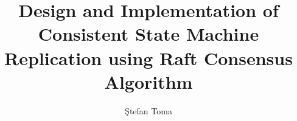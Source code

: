 \documentclass[12pt]{report}
\begin{document}
\title{Design and Implementation of Consistent State Machine Replication using Raft Consensus Algorithm}                     
\author{Ştefan Toma}                                            
                
\maketitle


\clearpage


\tableofcontents

\newpage
{}












\end{document}
